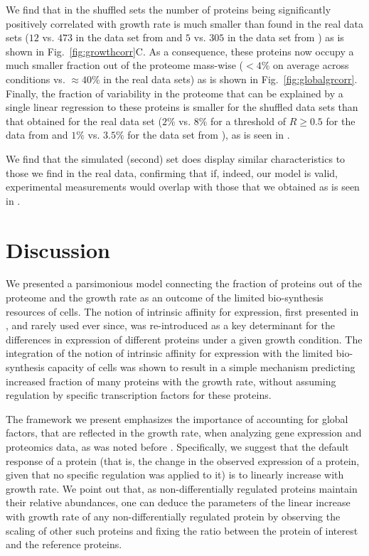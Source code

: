\documentclass[10pt,letterpaper]{article}
\newcommand{\hGlobal}{$473$}
\newcommand{\hGlobalShuff}{$12$}
\newcommand{\vnGlobalShuff}{$5$}
\newcommand{\vGlobalShuff}{\vnGlobalShuff{}}
\newcommand{\vnGlobal}{$305$}
\newcommand{\vGlobal}{\vnGlobal{}}
\begin{document}
We find that in the shuffled sets the number of proteins being significantly positively correlated with
growth rate is much smaller than found in the real data sets (\hGlobalShuff{} vs. \hGlobal{} in the data set from \cite{Schmidt2015} and \vGlobalShuff{} vs. \vGlobal{} in the data set from \cite{Peebo_2015}) as is shown in Fig.~\ref{fig:growthcorr}C.
As a consequence, these proteins now occupy a much smaller fraction out of the proteome mass-wise ($<4\%$ on average across conditions vs. $\approx 40\%$ in the real data sets) as is shown in Fig.~\ref{fig:globalgrcorr}.
Finally, the fraction of variability in the proteome that can be explained by a single linear regression to these proteins is smaller for the shuffled data sets than that obtained for the real data set ($2\%$ vs. $8\%$ for a threshold of $R\ge0.5$ for the data from \cite{Schmidt2015} and $1\%$ vs. $3.5\%$ for the data set from \cite{Peebo_2015}), as is seen in .

We find that the simulated (second) set does display similar characteristics to those we find in the real data, confirming that if, indeed, our model is valid, experimental measurements would overlap with those that we obtained as is seen in .

\section*{Discussion}
We presented a parsimonious model connecting the fraction of proteins out of the proteome and the growth rate as an outcome of the limited bio-synthesis resources of cells.
The notion of intrinsic affinity for expression, first presented in \cite{Maaloe1969}, and rarely used ever since, was re-introduced as a key determinant for the differences in expression of different proteins under a given growth condition.
The integration of the notion of intrinsic affinity for expression with the limited bio-synthesis capacity of cells was shown to result in a simple mechanism predicting increased fraction of many proteins with the growth rate, without assuming regulation by specific transcription factors for these proteins.

The framework we present emphasizes the importance of accounting for global factors, that are reflected in the growth rate, when analyzing gene expression and proteomics data, as was noted before \cite{Maaloe1969,Brauer2008,Klumpp2009,Klumpp2014,Scott2011,Scott2014,Scott2010,Berthoumieux2013,Keren2013,Gerosa2013,Valgepea2013,Hui_2015,Peebo_2015,Wei_e_2015}.
Specifically, we suggest that the default response of a protein (that is, the change in the observed expression of a protein, given that no specific regulation was applied to it) is to linearly increase with growth rate.
We point out that, as non-differentially regulated proteins maintain their relative abundances, one can deduce the parameters of the linear increase with growth rate of any non-differentially regulated protein by observing the scaling of other such proteins and fixing the ratio between the protein of interest and the reference proteins.
\end{document}

